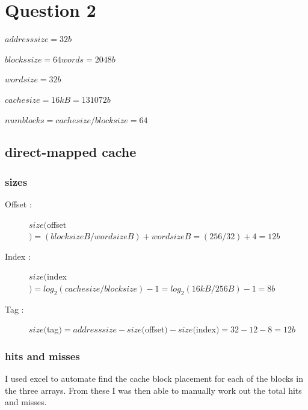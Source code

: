 \documentclass[12pt]{article}
\begin{document}
		\newpage
	
	\section{Question 2}

		$addresssize = 32 b$

		$blockssize = 64 words = 2048 b$

		$wordsize = 32b$

		$cachesize =  16kB = 131072 b$

		$numblocks = cachesize/blocksize = 64$


		\subsection{direct-mapped cache}

			\subsubsection{sizes}
				\begin{description}
					\item[Offset : ] $size($offset$) = (blocksize B/wordsize B) + wordsize B = (256/32) + 4 = 12b$
					\item[Index : ] $size($index$) = log_2(cachesize/blocksize) - 1 = log_2(16kB/256B) - 1 = 8b$
					\item[Tag : ] $size($tag$) = addresssize- size($offset$) - size($index$) = 32 - 12 - 8 = 12b$
				\end{description}

			\subsubsection{hits and misses}

I used excel to automate find the cache block placement for each of the blocks in the three arrays. From these I was then able to manually work out the total hits and misses.
\end{document}
